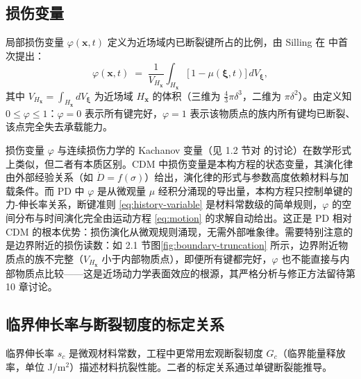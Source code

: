 \subsection{损伤变量}

局部损伤变量 $\varphi(\mathbf{x},t)$ 定义为近场域内已断裂键所占的比例，由 Silling 在 \cite{Silling2000} 中首次提出：
\begin{equation}
  \label{eq:damage-variable}
  \varphi(\mathbf{x},t) \;=\; \frac{1}{V_{H_{\mathbf{x}}}} \int_{H_{\mathbf{x}}} \bigl[\,1 - \mu(\boldsymbol{\xi},t)\bigr]\, dV_{\boldsymbol{\xi}},
\end{equation}
其中 $V_{H_{\mathbf{x}}} = \int_{H_{\mathbf{x}}} dV_{\boldsymbol{\xi}}$ 为近场域 $H_{\mathbf{x}}$ 的体积（三维为 $\frac{4}{3}\pi\delta^3$，二维为 $\pi\delta^2$）。由定义知 $0\leqslant\varphi\leqslant 1$：$\varphi=0$ 表示所有键完好，$\varphi=1$ 表示该物质点的族内所有键均已断裂、该点完全失去承载能力。

损伤变量 $\varphi$ 与连续损伤力学的 Kachanov 变量（见 1.2 节对 \cite{Kachanov1958} 的讨论）在数学形式上类似，但二者有本质区别。CDM 中损伤变量是本构方程的状态变量，其演化律由外部经验关系（如 $\dot{D}=f(\sigma)$）给出，演化律的形式与参数高度依赖材料与加载条件。而 PD 中 $\varphi$ 是从微观量 $\mu$ 经积分涌现的导出量，本构方程只控制单键的力-伸长率关系，断键准则 \eqref{eq:history-variable} 是材料常数级的简单规则，$\varphi$ 的空间分布与时间演化完全由运动方程 \eqref{eq:motion} 的求解自动给出。这正是 PD 相对 CDM 的根本优势：损伤演化从微观规则涌现，无需外部唯象律。需要特别注意的是边界附近的损伤读数：如 2.1 节图\ref{fig:boundary-truncation} 所示，边界附近物质点的族不完整（$V_{H_{\mathbf{x}}}$ 小于内部物质点），即便所有键都完好，$\varphi$ 也不能直接与内部物质点比较——这是近场动力学表面效应的根源，其严格分析与修正方法留待第 10 章讨论。

\subsection{临界伸长率与断裂韧度的标定关系}

临界伸长率 $s_c$ 是微观材料常数，工程中更常用宏观断裂韧度 $G_c$（临界能量释放率，单位 J/m$^2$）描述材料抗裂性能。二者的标定关系通过单键断裂能推导。

